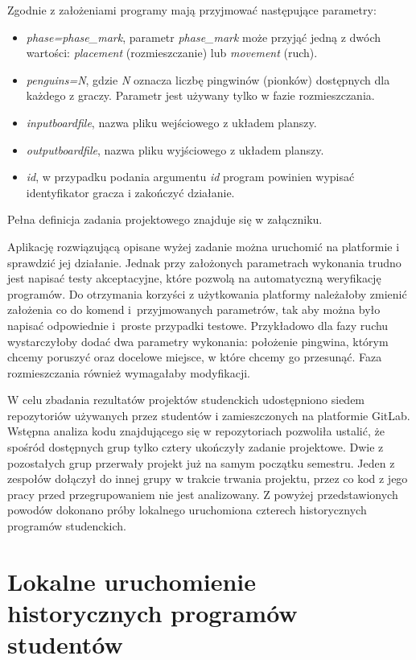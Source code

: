 Zgodnie z założeniami programy mają przyjmować następujące parametry:
\begin{itemize}
    \item \textit{phase=phase\_mark}, parametr \textit{phase\_mark} może przyjąć jedną z dwóch wartości: \textit{placement} (rozmieszczanie) lub \textit{movement} (ruch).
    \item \textit{penguins=N}, gdzie \textit{N} oznacza liczbę pingwinów (pionków) dostępnych dla każdego z graczy.
    Parametr jest używany tylko w fazie rozmieszczania.
    \item \textit{inputboardfile}, nazwa pliku wejściowego z układem planszy.
    \item \textit{outputboardfile}, nazwa pliku wyjściowego z układem planszy.
    \item \textit{id}, w przypadku podania argumentu \textit{id} program powinien wypisać identyfikator gracza i zakończyć działanie.
\end{itemize}
Pełna definicja zadania projektowego znajduje się w załączniku.

Aplikację rozwiązującą opisane wyżej zadanie można uruchomić na platformie i sprawdzić jej działanie.
Jednak przy założonych parametrach wykonania trudno jest napisać testy akceptacyjne, które pozwolą na automatyczną weryfikację programów.
Do otrzymania korzyści z użytkowania platformy należałoby zmienić założenia co do komend i~przyjmowanych parametrów, tak aby można było napisać odpowiednie i~proste przypadki testowe.
Przykładowo dla fazy ruchu wystarczyłoby dodać dwa parametry wykonania: położenie pingwina, którym chcemy poruszyć oraz docelowe miejsce, w które chcemy go przesunąć.
Faza rozmieszczania również wymagałaby modyfikacji.

W celu zbadania rezultatów projektów studenckich udostępniono siedem repozytoriów używanych przez studentów i zamieszczonych na platformie GitLab.
Wstępna analiza kodu znajdującego się w repozytoriach pozwoliła ustalić, że spośród dostępnych grup tylko cztery ukończyły zadanie projektowe.
Dwie z pozostałych grup przerwały projekt już na samym początku semestru.
Jeden z zespołów dołączył do innej grupy w trakcie trwania projektu, przez co kod z jego pracy przed przegrupowaniem nie jest analizowany.
Z powyżej przedstawionych powodów dokonano próby lokalnego uruchomiona czterech historycznych programów studenckich.

\section{Lokalne uruchomienie historycznych programów studentów}

